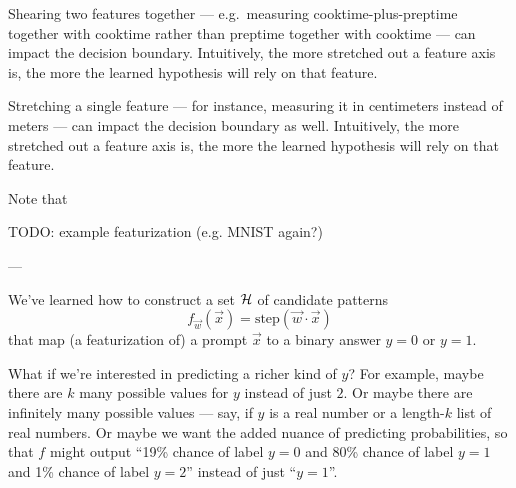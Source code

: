 \documentclass[11pt, justified]{tufte-book}
\newcommand{\attnsam}[1]{{\red \textsf{#1}}}
\newcommand{\sampassage}[1]{
   \vspace{0.1cm}
   \par\noindent{\hspace{-2cm}\normalsize \sc \gre #1} ---
}
\newcommand{\sfx}{\mathsf{x}}\newcommand{\frx}{\mathcal{x}}
\newcommand{\sfy}{\mathsf{y}}\newcommand{\fry}{\mathcal{y}}
\theoremstyle{definition}
\begin{document}
        Shearing two features together --- e.g.\ measuring
        cooktime-plus-preptime together with cooktime rather than preptime
        together with cooktime --- can impact the decision boundary.
        Intuitively, the more stretched out a feature axis is, the more the
        learned hypothesis will rely on that feature.

        Stretching a single feature --- for instance, measuring it in
        centimeters instead of meters --- can impact the decision boundary
        as well.  Intuitively, the more stretched out a feature axis is, 
        the more the learned hypothesis will rely on that feature.

        Note that


        \attnsam{TODO: example featurization (e.g. MNIST again?)}


      \sampassage{more classes and beyond}
        We've learned how to construct a set $\mathcal{H}$ of candidate patterns 
        $$
          f_{\vec w}(\vec x) = \text{step}(\vec w\cdot \vec x) 
        $$
        that map (a featurization of) a prompt $\vec x$ to a binary answer
        $y=0$ or $y=1$.

        What if we're interested in predicting a richer kind of $y$?  For
        example, maybe there are $k$ many possible values for $y$ instead of
        just $2$.  Or maybe there are infinitely many possible values --- say,
        if $y$ is a real number or a length-$k$ list of real numbers.  Or maybe
        we want the added nuance of predicting probabilities, so that $f$ might
        output ``19\% chance of label $y=0$ and 80\% chance of label $y=1$ and
        1\% chance of label $y=2$''
        instead of just ``$y=1$''. 
\end{document}
